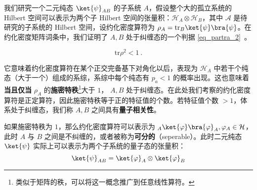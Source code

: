 

我们研究一个二元纯态 $\ket{\psi}_{AB}$ 的子系统 $A$，假设整个大的孤立系统的 Hilbert 空间可以表示为两个子 Hilbert 空间的张量积：$\mathcal{H}_A\otimes \mathcal{H}_B$，其中 $\mathcal A$ 是待研究的子系统的 Hilbert 空间，设约化密度算符为 $\rho_A=\text{tr}_B \ket{\psi}\bra{\psi}$。在约化密度矩阵词条中，我们证明了 $A,B$ 处于纠缠态的一个判据 \autoref{eq_partra_2}~。

\begin{equation}
\text{tr} \rho^2 <1~.
\end{equation}

它意味着约化密度算符在某个正交完备基下对角化以后，表现为 $\mathcal{H}_A$ 中若干个纯态（大于一个）组成的系综，系综中每个纯态有 $p_a<1$ 的概率出现。这也意味着\textbf{当且仅当} $\rho_A$ 的\textbf{施密特秩}\footnote{类似于矩阵的秩，可以将这一概念推广到任意线性算符。}大于 $1$， $A,B$ 处于纠缠态。在此处我们考察的约化密度算符是正定算符，因此施密特秩等于正的特征值的个数。若特征值个数 $>1$，体系处于纠缠态，我们称 $A,B$ 之间具有\textbf{量子相关性}。

如果施密特秩为 $1$，那么约化密度算符可以表示为 ${}_A\ket{\varphi}\bra{\varphi}_A,\varphi_A\in \mathcal{H}$，此时 $A$ 与 $B$ 之间是不纠缠的，或者被称为\textbf{可分的}（seperable）。此时二元纯态 $\ket{\psi}$ 实际上可以表示为两个子系统的量子态的张量积：
\begin{equation}
\ket{\psi}_{AB}=\ket{\varphi}_A\otimes \ket{\varphi}_B
\end{equation}
